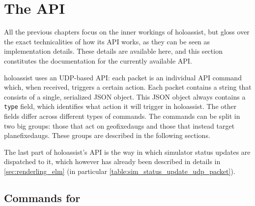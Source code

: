 \chapter{The  API}\label{appendix:external_meshes_api}

All the previous chapters focus on the inner workings of \gls{holoassist}, but gloss over the exact technicalities of how its \gls{API} works, as they can be seen as implementation details. These details are available here, and this section constitutes the documentation for the currently available \gls{API}.

\Gls{holoassist} uses an \gls{UDP}-based \gls{API}: each packet is an individual \gls{API} command which, when received, triggers a certain action. Each packet contains a string that consists of a single, serialized JSON\cite{bray_javascript_2017} object. This JSON object always contains a \texttt{type} field, which identifies what action it will trigger in \gls{holoassist}. The other fields differ across different types of commands. The commands can be split in two big groups: those that act on \glspl{geofixedaug} and those that instead target \glspl{planefixedaug}. These groups are described in the following sections.

The last part of \gls{holoassist}'s \gls{API} is the way in which simulator status updates are dispatched to it, which however has already been described in details in \autoref{sec:renderling_elm} (in particular \autoref{table:sim_status_update_udp_packet}).

\section{Commands for }

